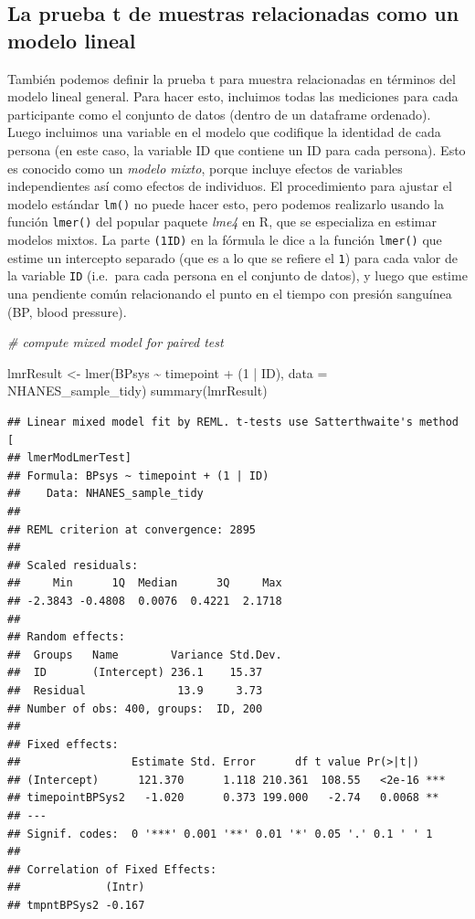 \documentclass[
  12pt,
]{book}
\newenvironment{Shaded}{\begin{snugshade}}{\end{snugshade}}
\newcommand{\AttributeTok}[1]{\textcolor[rgb]{0.77,0.63,0.00}{#1}}
\newcommand{\CommentTok}[1]{\textcolor[rgb]{0.56,0.35,0.01}{\textit{#1}}}
\newcommand{\DecValTok}[1]{\textcolor[rgb]{0.00,0.00,0.81}{#1}}
\newcommand{\FunctionTok}[1]{\textcolor[rgb]{0.00,0.00,0.00}{#1}}
\newcommand{\NormalTok}[1]{#1}
\newcommand{\OtherTok}[1]{\textcolor[rgb]{0.56,0.35,0.01}{#1}}
\newcommand{\SpecialCharTok}[1]{\textcolor[rgb]{0.00,0.00,0.00}{#1}}
\theoremstyle{definition}
\theoremstyle{definition}
\theoremstyle{definition}
\theoremstyle{remark}
\begin{document}
\hypertarget{la-prueba-t-de-muestras-relacionadas-como-un-modelo-lineal}{%
\subsection{La prueba t de muestras relacionadas como un modelo lineal}\label{la-prueba-t-de-muestras-relacionadas-como-un-modelo-lineal}}

También podemos definir la prueba t para muestra relacionadas en términos del modelo lineal general. Para hacer esto, incluimos todas las mediciones para cada participante como el conjunto de datos (dentro de un dataframe ordenado). Luego incluimos una variable en el modelo que codifique la identidad de cada persona (en este caso, la variable ID que contiene un ID para cada persona). Esto es conocido como un \emph{modelo mixto}, porque incluye efectos de variables independientes así como efectos de individuos. El procedimiento para ajustar el modelo estándar \texttt{lm()} no puede hacer esto, pero podemos realizarlo usando la función \texttt{lmer()} del popular paquete \emph{lme4} en R, que se especializa en estimar modelos mixtos. La parte \texttt{(1\textbar{}ID)} en la fórmula le dice a la función \texttt{lmer()} que estime un intercepto separado (que es a lo que se refiere el \texttt{1}) para cada valor de la variable \texttt{ID} (i.e.~para cada persona en el conjunto de datos), y luego que estime una pendiente común relacionando el punto en el tiempo con presión sanguínea (BP, blood pressure).

\begin{Shaded}
\begin{Highlighting}[]
\CommentTok{\# compute mixed model for paired test}

\NormalTok{lmrResult }\OtherTok{\textless{}{-}} \FunctionTok{lmer}\NormalTok{(BPsys }\SpecialCharTok{\textasciitilde{}}\NormalTok{ timepoint }\SpecialCharTok{+}\NormalTok{ (}\DecValTok{1} \SpecialCharTok{|}\NormalTok{ ID), }
                  \AttributeTok{data =}\NormalTok{ NHANES\_sample\_tidy)}
\FunctionTok{summary}\NormalTok{(lmrResult)}
\end{Highlighting}
\end{Shaded}

\begin{verbatim}
## Linear mixed model fit by REML. t-tests use Satterthwaite's method [
## lmerModLmerTest]
## Formula: BPsys ~ timepoint + (1 | ID)
##    Data: NHANES_sample_tidy
## 
## REML criterion at convergence: 2895
## 
## Scaled residuals: 
##     Min      1Q  Median      3Q     Max 
## -2.3843 -0.4808  0.0076  0.4221  2.1718 
## 
## Random effects:
##  Groups   Name        Variance Std.Dev.
##  ID       (Intercept) 236.1    15.37   
##  Residual              13.9     3.73   
## Number of obs: 400, groups:  ID, 200
## 
## Fixed effects:
##                 Estimate Std. Error      df t value Pr(>|t|)    
## (Intercept)      121.370      1.118 210.361  108.55   <2e-16 ***
## timepointBPSys2   -1.020      0.373 199.000   -2.74   0.0068 ** 
## ---
## Signif. codes:  0 '***' 0.001 '**' 0.01 '*' 0.05 '.' 0.1 ' ' 1
## 
## Correlation of Fixed Effects:
##             (Intr)
## tmpntBPSys2 -0.167
\end{verbatim}
\end{document}
